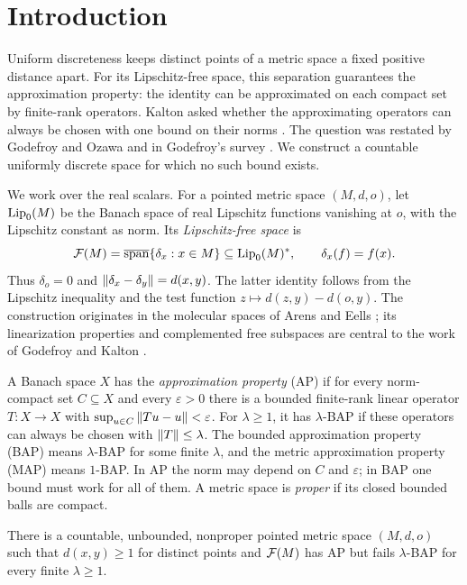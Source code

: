 \section{Introduction}\label{sec:introduction}

Uniform discreteness keeps distinct points of a metric space a fixed positive
distance apart. For its Lipschitz-free space, this separation guarantees the
approximation property: the identity can be approximated on each compact set
by finite-rank operators. Kalton asked whether the approximating operators
can always be chosen with one bound on their norms
\cite[Proposition~4.4 and following remarks, p.~185]{Kalton04}. The question
was restated by Godefroy and Ozawa \cite[Question~1]{GodefroyOzawa14} and in
Godefroy's survey \cite[Problem~6.2]{Godefroy15}. We construct a countable
uniformly discrete space for which no such bound exists.

We work over the real scalars. For a pointed metric space $(M,d,o)$, let
$\operatorname{Lip}_0(M)$ be the Banach space of real Lipschitz functions vanishing at $o$,
with the Lipschitz constant as norm. Its \emph{Lipschitz-free space} is
\[
 \mathcal F(M)=\overline{\operatorname{span}}\{\delta_x:x\in M\}
 \subseteq\operatorname{Lip}_0(M)^*,\qquad \delta_x(f)=f(x).
\]
Thus $\delta_o=0$ and $\left\|\delta_x-\delta_y\right\|=d(x,y)$. The latter
identity follows from the Lipschitz inequality and the test function
$z\mapsto d(z,y)-d(o,y)$.
The construction originates in the molecular spaces of Arens and Eells
\cite[\S2]{ArensEells56}; its linearization properties and complemented free
subspaces are central to the work of Godefroy and Kalton
\cite[\S2]{GodefroyKalton03}.

A Banach space $X$ has the \emph{approximation property} (AP) if for every
norm-compact set $C\subseteq X$ and every $\varepsilon>0$ there is a bounded
finite-rank linear operator $T:X\to X$ with
$\sup_{u\in C}\left\|Tu-u\right\|<\varepsilon$. For $\lambda\ge1$, it has
$\lambda$-BAP if these operators can always be chosen with
$\left\|T\right\|\le\lambda$. The bounded approximation property (BAP) means
$\lambda$-BAP for some finite $\lambda$, and the metric approximation
property (MAP) means $1$-BAP. In AP the norm may depend on $C$ and
$\varepsilon$; in BAP one bound must work for all of them. A metric space
is \emph{proper} if its closed bounded balls are compact.

\begin{theorem}\label{thm:main}
There is a countable, unbounded, nonproper pointed metric space $(M,d,o)$
such that $d(x,y)\ge1$ for distinct points and $\mathcal F(M)$ has AP but fails
$\lambda$-BAP for every finite $\lambda\ge1$.
\end{theorem}

